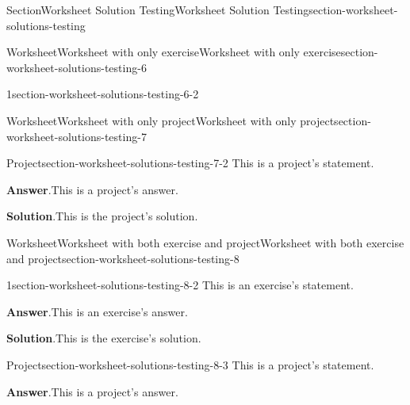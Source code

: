 \documentclass[oneside,10pt,]{article}
\newcommand{\blocktitlefont}{\relax}
\numberwithin{equation}{section}
\begin{document}
\begin{sectionptx}{Section}{Worksheet Solution Testing}{}{Worksheet Solution Testing}{}{}{section-worksheet-solutions-testing}
\begin{worksheet-subsection}{Worksheet}{Worksheet with only exercise}{}{Worksheet with only exercise}{}{}{section-worksheet-solutions-testing-6}
\begin{divisionexercise}{1}{}{}{section-worksheet-solutions-testing-6-2}
\end{divisionexercise}%
\end{worksheet-subsection}
\restoregeometry
%
%
\typeout{************************************************}
\typeout{************************************************}
%
\begin{worksheet-subsection}{Worksheet}{Worksheet with only project}{}{Worksheet with only project}{}{}{section-worksheet-solutions-testing-7}
\begin{project}{Project}{}{section-worksheet-solutions-testing-7-2}%
This is a project's statement.%
\par\smallskip%
\noindent\textbf{\blocktitlefont Answer}.\hypertarget{section-worksheet-solutions-testing-7-2-2}{}\quad{}This is a project's answer.%
\par\smallskip%
\noindent\textbf{\blocktitlefont Solution}.\hypertarget{section-worksheet-solutions-testing-7-2-3}{}\quad{}This is the project's solution.%
\end{project}%
\end{worksheet-subsection}
\restoregeometry
%
%
\typeout{************************************************}
\typeout{************************************************}
%
\begin{worksheet-subsection}{Worksheet}{Worksheet with both exercise and project}{}{Worksheet with both exercise and project}{}{}{section-worksheet-solutions-testing-8}
\begin{divisionexercise}{1}{}{}{section-worksheet-solutions-testing-8-2}%
This is an exercise's statement.%
\par\smallskip%
\noindent\textbf{\blocktitlefont Answer}.\hypertarget{section-worksheet-solutions-testing-8-2-2}{}\quad{}This is an exercise's answer.%
\par\smallskip%
\noindent\textbf{\blocktitlefont Solution}.\hypertarget{section-worksheet-solutions-testing-8-2-3}{}\quad{}This is the exercise's solution.%
\end{divisionexercise}%
\begin{project}{Project}{}{section-worksheet-solutions-testing-8-3}%
This is a project's statement.%
\par\smallskip%
\noindent\textbf{\blocktitlefont Answer}.\hypertarget{section-worksheet-solutions-testing-8-3-2}{}\quad{}This is a project's answer.%

\end{project}
\end{worksheet-subsection}
\end{sectionptx}
\end{document}
